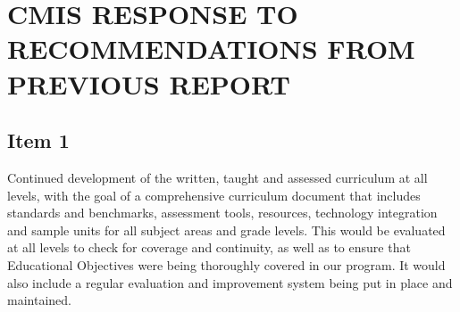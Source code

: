 
\section{CMIS RESPONSE TO RECOMMENDATIONS FROM PREVIOUS REPORT }
\subsection{Item 1}


Continued development of the written, taught and assessed curriculum at all levels, with the goal of a comprehensive curriculum document that includes standards and benchmarks, assessment tools, resources, technology integration and sample units for all subject areas and grade levels. This would be evaluated at all levels to check for coverage and continuity, as well as to ensure that Educational Objectives were being thoroughly covered in our program. It would also include a regular evaluation and improvement system being put in place and maintained.

